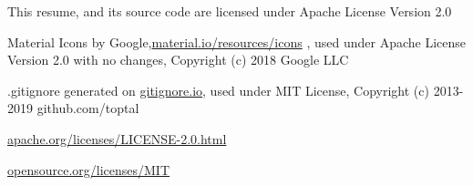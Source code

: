 \hspace{1pt}

\tiny{

This resume, and its source code are licensed under Apache License Version 2.0

Material Icons by Google,{\secondaryColor\href{https://material.io/resources/icons}{material.io/resources/icons} }, used under Apache License Version 2.0 with no changes, Copyright (c) 2018 Google LLC

.gitignore generated on {\secondaryColor\href{https://gitignore.io}{gitignore.io}}, used under MIT License, Copyright (c) 2013-2019 github.com/toptal

\secondaryColor\href{https://www.apache.org/licenses/LICENSE-2.0.html}{apache.org/licenses/LICENSE-2.0.html}

\secondaryColor\href{https://opensource.org/licenses/MIT}{opensource.org/licenses/MIT}


}